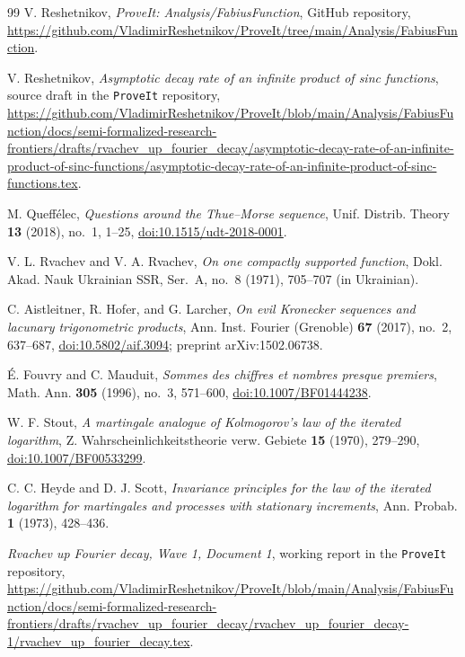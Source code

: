 \documentclass[11pt,oneside]{article}
\theoremstyle{definition}
\theoremstyle{remark}
\begin{document}
\begin{thebibliography}{99}
V. Reshetnikov,
\emph{ProveIt: Analysis/FabiusFunction}, GitHub repository,
\url{https://github.com/VladimirReshetnikov/ProveIt/tree/main/Analysis/FabiusFunction}.

V. Reshetnikov,
\emph{Asymptotic decay rate of an infinite product of sinc functions}, source draft in the
\texttt{ProveIt} repository,
\url{https://github.com/VladimirReshetnikov/ProveIt/blob/main/Analysis/FabiusFunction/docs/semi-formalized-research-frontiers/drafts/rvachev_up_fourier_decay/asymptotic-decay-rate-of-an-infinite-product-of-sinc-functions/asymptotic-decay-rate-of-an-infinite-product-of-sinc-functions.tex}.

M. Queff\'elec,
\emph{Questions around the Thue--Morse sequence},
Unif. Distrib. Theory \textbf{13} (2018), no.~1, 1--25,
\href{https://doi.org/10.1515/udt-2018-0001}{doi:10.1515/udt-2018-0001}.

V. L. Rvachev and V. A. Rvachev,
\emph{On one compactly supported function},
Dokl. Akad. Nauk Ukrainian SSR, Ser.~A, no.~8 (1971), 705--707
(in Ukrainian).


C. Aistleitner, R. Hofer, and G. Larcher,
\emph{On evil Kronecker sequences and lacunary trigonometric products},
Ann. Inst. Fourier (Grenoble) \textbf{67} (2017), no.~2, 637--687,
\href{https://doi.org/10.5802/aif.3094}{doi:10.5802/aif.3094};
preprint arXiv:1502.06738.

\'E. Fouvry and C. Mauduit,
\emph{Sommes des chiffres et nombres presque premiers},
Math. Ann. \textbf{305} (1996), no.~3, 571--600,
\href{https://doi.org/10.1007/BF01444238}{doi:10.1007/BF01444238}.

W. F. Stout,
\emph{A martingale analogue of Kolmogorov's law of the iterated logarithm},
Z. Wahrscheinlichkeitstheorie verw. Gebiete \textbf{15} (1970), 279--290,
\href{https://doi.org/10.1007/BF00533299}{doi:10.1007/BF00533299}.

C. C. Heyde and D. J. Scott,
\emph{Invariance principles for the law of the iterated logarithm for martingales and
processes with stationary increments},
Ann. Probab. \textbf{1} (1973), 428--436.

\emph{Rvachev up Fourier decay, Wave 1, Document 1}, working report in the
\texttt{ProveIt} repository,
\url{https://github.com/VladimirReshetnikov/ProveIt/blob/main/Analysis/FabiusFunction/docs/semi-formalized-research-frontiers/drafts/rvachev_up_fourier_decay/rvachev_up_fourier_decay-1/rvachev_up_fourier_decay.tex}.


\end{thebibliography}
\end{document}
